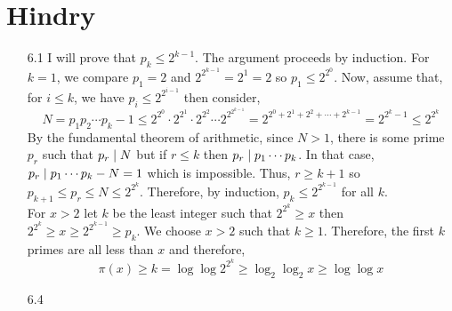 \documentclass[12pt]{extarticle}
\begin{document}

\section*{Hindry}
 
\begin{enumerate}
\item[6.1] I will prove that $p_k \le 2^{k-1}$. The argument proceeds by induction. For $k = 1$, we compare $p_1 = 2$ and $2^{2^{k-1}} = 2^1 = 2$ so $p_1 \le 2^{2^0}$. Now, assume that, for $i \le k$, we have $p_i \le 2^{2^{i-1}}$ then consider,
\[N = p_1 p_2 \cdots p_k - 1 \le 2^{2^0} \cdot 2^{2^{1}} \cdot 2^{2^{2}} \cdots 2^{2^{2^{k-1}}} = 2^{2^0 + 2^1 + 2^2 + \cdots + 2^{k-1}} = 2^{2^{k} - 1} \le 2^{2^k} \] 
By the fundamental theorem of arithmetic, since $N > 1$, there is some prime $p_r$ such that $p_r \mid N$ but if $r \le k$ then $p_r \mid p_1 \cdots p_k$. In that case, $p_r \mid p_1 \cdots p_k - N = 1$ which is impossible. Thus, $r \ge k + 1$ so $p_{k+1} \le p_r \le N \le 2^{2^{k}}$. Therefore, by induction, $p_k \le 2^{2^{k-1}}$ for all $k$. \bigskip \\
For $x > 2$ let $k$ be the least integer such that $2^{2^k} \ge x$ then $2^{2^k} \ge x \ge 2^{2^{k-1}} \ge p_k$. We choose $x > 2$ such that $k \ge 1$. Therefore, the first $k$ primes are all less than $x$ and therefore,
\[\pi(x) \ge k = \log{\log{2^{2^k}}} \ge \log_2{\log_2{x}} \ge \log{\log{x}}\] 
     
\item[6.4]


\end{enumerate}
\end{document}
